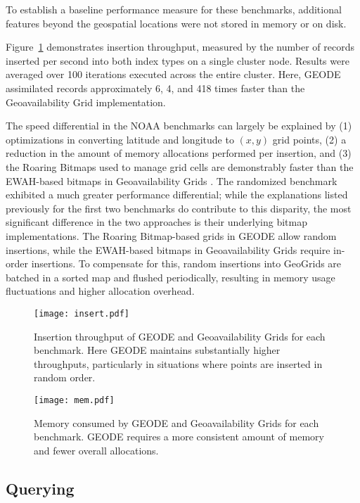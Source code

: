 To establish a baseline performance measure for these benchmarks, additional features beyond the geospatial locations were not stored in memory or on disk.

Figure~\ref{fig:insert} demonstrates insertion throughput, measured by the number of records inserted per second into both index types on a single cluster node. Results were averaged over 100 iterations executed across the entire cluster. Here, GEODE assimilated records approximately 6, 4, and 418 times faster than the Geoavailability Grid implementation.

The speed differential in the NOAA benchmarks can largely be explained by (1) optimizations in converting latitude and longitude to $(x, y)$ grid points, (2) a reduction in the amount of memory allocations performed per insertion, and (3) the Roaring Bitmaps used to manage grid cells are demonstrably faster than the EWAH-based bitmaps in Geoavailability Grids \cite{lemire2016consistently}. The randomized benchmark exhibited a much greater performance differential; while the explanations listed previously for the first two benchmarks do contribute to this disparity, the most significant difference in the two approaches is their underlying bitmap implementations. The Roaring Bitmap-based grids in GEODE allow random insertions, while the EWAH-based bitmaps in Geoavailability Grids require in-order insertions. To compensate for this, random insertions into GeoGrids are batched in a sorted map and flushed periodically, resulting in memory usage fluctuations and higher allocation overhead.

\begin{figure}
    \centerline{\texttt{[image: insert.pdf]}}
    \caption{Insertion throughput of GEODE and Geoavailability Grids for each benchmark. Here GEODE maintains substantially higher throughputs, particularly in situations where points are inserted in random order.}
    \label{fig:insert}
\end{figure}

\begin{figure}
    \centerline{\texttt{[image: mem.pdf]}}
    \caption{Memory consumed by GEODE and Geoavailability Grids for each benchmark. GEODE requires a more consistent amount of memory and fewer overall allocations.}
    \label{fig:mem}
\end{figure}

\subsection{Querying}

